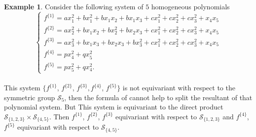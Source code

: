 \documentclass[12pt,a4paper,reqno]{amsart}
\theoremstyle{definition}
\newtheorem{example}[theorem]{Example}
\theoremstyle{remark}
\numberwithin{equation}{section}
\begin{document}
\begin{example}
Consider the following system  of $5$ homogeneous polynomials
 \\
\begin{equation*}
\begin{cases}
f^{\{1\}}=ax_1^2+bx_1^2+bx_1x_2+bx_1x_3+cx_1^2+cx_2^2+cx_3^2+x_4x_5\\ 
f^{\{2\}}=ax_2^2+bx_1x_2+bx_2^2+bx_2x_3+cx_1^2+cx_2^2+cx_3^2+x_4x_5\\
f^{\{3\}}=ax_3^2+bx_1x_3+bx_2x_3+bx_3^2+cx_1^2+cx_2^2+cx_3^2+x_4x_5\\
f^{\{4\}}=px_4^2+qx_5^2\\
f^{\{5\}}=px_5^2+qx_4^2.
\end{cases}
\end{equation*}\\
This system $\{f^{\{1\}}$, $f^{\{2\}}$, $f^{\{3\}}, f^{\{4\}}$, $f^{\{5\}} \}$ is not equivariant with respect to the symmetric group $\mathcal{S}_5$, then the  formula of \cite[Theorem 3.3]{BuKa16} cannot help to split the resultant of that polynomial system. But This system is equivariant to the direct product $\mathcal{S}_{\{1
,2,3\}}\times\mathcal{S}_{\{4,5\}} $. Then 
$f^{\{1\}}$, $f^{\{2\}}$, $f^{\{3\}}$  equivariant with  respect to $\mathcal{S}_{\{1
,2,3\}}$ and $f^{\{4\}}$, $f^{\{5\}}$ equivariant with  respect to $\mathcal{S}_{\{4,5\}}.$  



\end{example}
\end{document}
